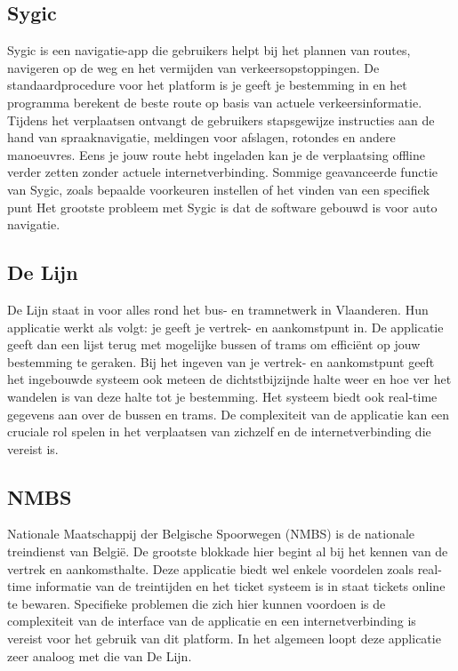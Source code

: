 \subsection{Sygic}
\label{sec:sygic}

Sygic is een navigatie-app die gebruikers helpt bij het plannen van routes, navigeren op de weg en het vermijden van verkeersopstoppingen. De standaardprocedure voor het platform is je geeft je bestemming in en het programma berekent de beste route op basis van actuele verkeersinformatie. Tijdens het verplaatsen ontvangt de gebruikers stapsgewijze instructies aan de hand van spraaknavigatie, meldingen voor afslagen, rotondes en andere manoeuvres. Eens je jouw route hebt ingeladen kan je de verplaatsing offline verder zetten zonder actuele internetverbinding. Sommige geavanceerde functie van Sygic, zoals bepaalde voorkeuren instellen of het vinden van een specifiek punt %
Het grootste probleem met Sygic is dat de software gebouwd is voor auto navigatie.

\subsection{De Lijn}
\label{sec:de-lijn}

De Lijn staat in voor alles rond het bus- en tramnetwerk in Vlaanderen. Hun applicatie werkt als volgt: je geeft je vertrek- en aankomstpunt in. De applicatie geeft dan een lijst terug met mogelijke bussen of trams om efficiënt op jouw bestemming te geraken. Bij het ingeven van je vertrek- en aankomstpunt geeft het ingebouwde systeem ook meteen de dichtstbijzijnde halte weer en hoe ver het wandelen is van deze halte tot je bestemming. Het systeem biedt ook real-time gegevens aan over de bussen en trams. De complexiteit van de applicatie kan een cruciale rol spelen in het verplaatsen van zichzelf en de internetverbinding die vereist is.

\subsection{NMBS}
\label{sec:nmbs}

Nationale Maatschappij der Belgische Spoorwegen (NMBS) is de nationale treindienst van België. De grootste blokkade hier begint al bij het kennen van de vertrek en aankomsthalte. Deze applicatie biedt wel enkele voordelen zoals real-time informatie van de treintijden en het ticket systeem is in staat tickets online te bewaren. Specifieke problemen die zich hier kunnen voordoen is de complexiteit van de interface van de applicatie en een internetverbinding is vereist voor het gebruik van dit platform. In het algemeen loopt deze applicatie zeer analoog met die van De Lijn.

